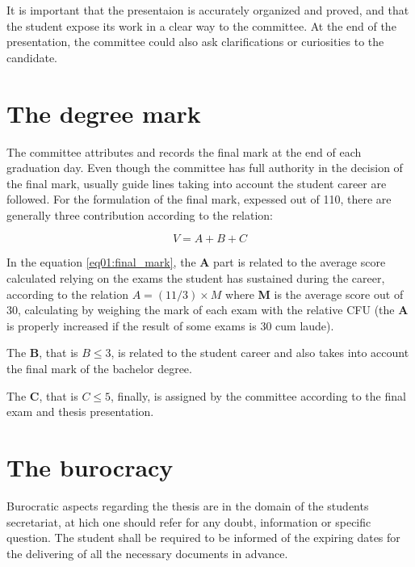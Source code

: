 It is important that the presentaion is accurately organized and proved, and that the student expose its work in a clear way to the committee. At the end of the presentation, the committee could also ask clarifications or curiosities to the candidate.

\section{The degree mark}

The committee attributes and records the final mark at the end of each graduation day. Even though the committee has full authority in the decision of the final mark, usually guide lines taking into account the student career are followed. For the formulation of the final mark, expessed out of 110, there are generally three contribution according to the relation:

\begin{equation}\label{eq01:final_mark}
V = A + B + C
\end{equation}

In the equation \ref{eq01:final_mark}, the \textbf{A} part is related to the average score calculated relying on the exams the student has sustained during the career, according to the relation $A = (11/3)\times M$ where \textbf{M} is the average score out of 30, calculating by weighing the mark of each exam with the relative CFU (the \textbf{A} is properly increased if the result of some exams is 30 cum laude).

The \textbf{B}, that is $B\leqslant 3$, is related to the student career and also takes into account the final mark of the bachelor degree.

The \textbf{C}, that is $C\leqslant 5$, finally, is assigned by the committee according to the final exam and thesis presentation.

\section{The burocracy}

Burocratic aspects regarding the thesis are in the domain of the students secretariat, at hich one should refer for any doubt, information or specific question. The student shall be required to be informed of the expiring dates for the delivering of all the necessary documents in advance.